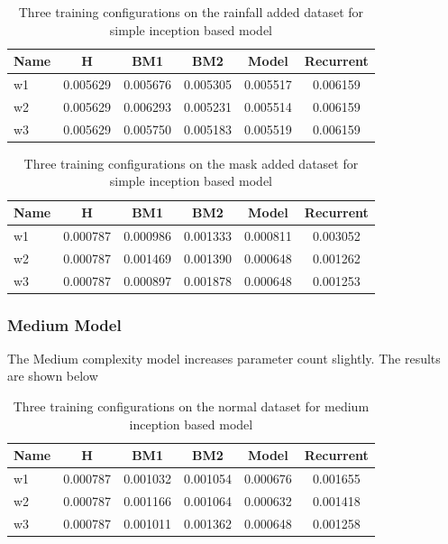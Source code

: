 \begin{table}[htbp]
	\centering
	\caption{Three training configurations on the rainfall added dataset for simple inception based model}
	\label{tab:simple_rf}
	\begin{tabular}{p{2cm}ccccc}
		\toprule
		Name &  H &  BM1 &  BM2 &  Model &  Recurrent \\
		\midrule
		w1 &       0.005629 &        0.005676 &        0.005305 &   0.005517 &            0.006159 \\
		w2 &       0.005629 &        0.006293 &        0.005231 &   0.005514 &            0.006159 \\
		w3 &       0.005629 &        0.005750 &        0.005183 &   0.005519 &            0.006159 \\
		\bottomrule
	\end{tabular}
\end{table}

\begin{table}[htbp]
	\centering
	\caption{Three training configurations on the mask added dataset for simple inception based model}
	\label{tab:simple_mask}
	\begin{tabular}{p{2cm}ccccc}
		\toprule
		Name &  H &  BM1 &  BM2 &  Model &  Recurrent \\
		\midrule
		w1 &       0.000787 &        0.000986 &        0.001333 &   0.000811 &            0.003052 \\
		w2 &       0.000787 &        0.001469 &        0.001390 &   0.000648 &            0.001262 \\
		w3 &       0.000787 &        0.000897 &        0.001878 &   0.000648 &            0.001253 \\
		\bottomrule
	\end{tabular}
\end{table}


\subsubsection*{Medium Model}
The Medium complexity model increases parameter count slightly. The results are shown below
\begin{table}[htbp]
	\centering
	\caption{Three training configurations on the normal dataset for medium inception based model}
	\label{tab:medium_normal}
	\begin{tabular}{p{2cm}ccccc}
		\toprule
		Name &  H &  BM1 &  BM2 &  Model &  Recurrent \\
		\midrule
		w1 &       0.000787 &        0.001032 &        0.001054 &   0.000676 &            0.001655 \\
		w2 &       0.000787 &        0.001166 &        0.001064 &   0.000632 &            0.001418 \\
		w3 &       0.000787 &        0.001011 &        0.001362 &   0.000648 &            0.001258 \\
		\bottomrule
	\end{tabular}
\end{table}

